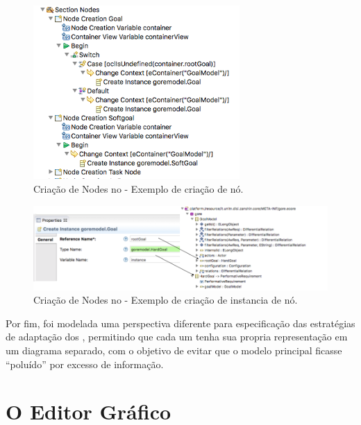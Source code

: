 \begin{figure}
	\centering
	\includegraphics[width=0.7\textwidth]{figuras/unagi/exemplo-criacao-nodes.png}
	\caption{Criação de Nodes no \sirius - Exemplo de criação de nó.}
	\label{figura-criacao-node}
\end{figure}

\begin{figure}
	\centering
	\includegraphics[width=1\textwidth]{figuras/unagi/exemplo-propriedades-create-instance.png}
	\caption{Criação de Nodes no \sirius - Exemplo de criação de instancia de nó.}
	\label{figura-propriedades-create-instance}
\end{figure}

Por fim, foi modelada uma perspectiva diferente para especificação das estratégias de adaptação dos \awreqs, permitindo que cada um tenha sua propria representação em um diagrama separado, com o objetivo de evitar que o modelo principal ficasse ``poluído'' por excesso de informação. 

\section{O Editor Gráfico}
\label{sec-unagi-apresentacao-editor}

